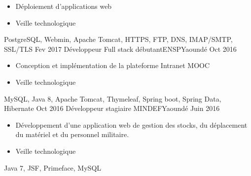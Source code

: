 \begin{experiences}
{\begin{itemize}
                        \item Déploiement d'applications web
                        \item Veille technologique                                                                    
                      \end{itemize}
                    }
                {PostgreSQL, Webmin, Apache Tomcat, HTTPS, FTP, DNS, IMAP/SMTP, SSL/TLS}
  \emptySeparator
  \consultantexperience
    {Fev 2017} {Développeur Full stack débutant}{ENSP}{Yaoundé}
    {Oct 2016}    {}{ }
                    {
                      \begin{itemize}
                        \item Conception et implémentation de la plateforme Intranet MOOC
                        \item Veille technologique                                                                    
                      \end{itemize}
                    }
                {MySQL, Java 8, Apache Tomcat, Thymeleaf, Spring boot, Spring Data, Hibernate}
  \emptySeparator
  \experience
    {Oct 2016}     {Développeur stagiaire }{MINDEF}{Yaoundé}
    {Juin 2016}    {
                      \begin{itemize}
                        \item Développement d’une application web de gestion des stocks, du déplacement du matériel et du personnel militaire.
                        \item Veille technologique   
                      \end{itemize}
                    }
                    {Java 7, JSF, Primeface, MySQL}

\end{experiences}
